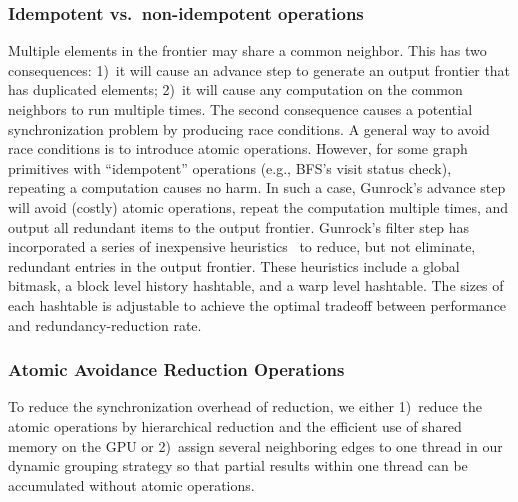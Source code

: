 \documentclass[format=acmsmall,review=false,screen=true]{acmart}
\begin{document}
\subsubsection{Idempotent vs.\ non-idempotent operations}
\label{subsec:idem}
Multiple elements in the frontier may share a common neighbor. This
has two consequences: 1)~it will cause an advance step to generate an
output frontier that has duplicated elements; 2)~it will cause any
computation on the common neighbors to run multiple times. The second
consequence causes a potential synchronization problem by producing
race conditions. A general way to avoid race conditions is to
introduce atomic operations. However, for some graph primitives with
``idempotent'' operations (e.g., BFS's visit status check), repeating
a computation causes no harm. In such a case, Gunrock's advance step
will avoid (costly) atomic operations, repeat the computation multiple
times, and output all redundant items to the output frontier.
Gunrock's filter step has incorporated a series of inexpensive
heuristics~\cite{Merrill:2012:SGG} to reduce, but not eliminate,
redundant entries in the output frontier. These heuristics include a
global bitmask, a block level history hashtable, and a warp level
hashtable. The sizes of each hashtable is adjustable to achieve the
optimal tradeoff between performance and redundancy-reduction rate.

\subsubsection{Atomic Avoidance Reduction Operations}
To reduce the synchronization overhead of reduction, we either
1)~reduce the atomic operations by hierarchical reduction and the
efficient use of shared memory on the GPU or 2)~assign several
neighboring edges to one thread in our dynamic grouping strategy so
that partial results within one thread can be accumulated without
atomic operations.
\end{document}
